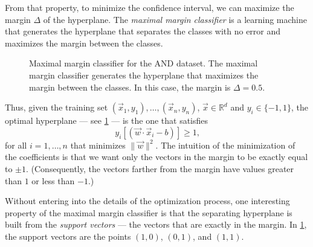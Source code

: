From that property, to minimize the confidence interval, we can maximize the margin
$\Delta$ of the hyperplane.  The \emph{maximal margin classifier} is a learning machine
that generates the hyperplane that separates the classes with no error and maximizes the
margin between the classes.

\begin{figure}
  \centering
  \caption{
  Maximal margin classifier for the AND dataset.
  The maximal margin classifier generates the hyperplane that maximizes the margin between
  the classes.  In this case, the margin is $\Delta = 0.5$.
  }
  \label{fig:maximal-margin-and}
\end{figure}

Thus, given the training set $(\vec{x}_1, y_1), \dots, (\vec{x}_n, y_n)$, $\vec{x} \in
\mathbb{R}^d$ and $y_i \in \{-1, 1\}$, the optimal hyperplane --- see
\cref{fig:maximal-margin-and} --- is the one that satisfies
\[
  y_i \left[(\vec{w} \cdot \vec{x}_i - b)\right] \geq 1\text{,}
\]
for all $i = 1, \dots, n$ that minimizes $\|\vec{w}\|^2$.  The intuition of the
minimization of the coefficients is that we want only the vectors in the margin to be
exactly equal to $\pm 1$.  (Consequently, the vectors farther from the margin have values
greater than $1$ or less than $-1$.)

Without entering into the details of the optimization process, one interesting property of
the maximal margin classifier is that the separating hyperplane is built from the \emph{support vectors}
--- the vectors that are exactly in the margin.  In \cref{fig:maximal-margin-and}, the
support vectors are the points $(1, 0)$, $(0, 1)$, and $(1, 1)$.

